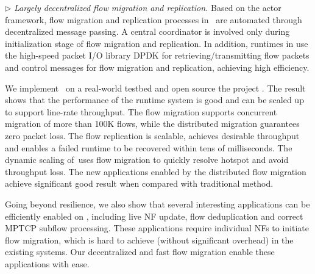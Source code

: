 

$\triangleright$ {\em Largely decentralized flow migration and replication.} Based on the actor framework, flow migration and replication processes in \nfactor~are automated through decentralized message passing. A central coordinator is involved only during initialization stage of flow migration and replication. %
 In addition, runtimes in \nfactor use the high-speed packet I/O library DPDK \cite{dpdk} for retrieving/transmitting flow packets and control messages for flow migration and replication, achieving high efficiency.


We implement \nfactor~on a real-world testbed and open source the project \cite{projectcode}.
The result shows that the performance of the runtime system is good and can be scaled up to support line-rate throughput. The flow migration supports concurrent migration of more than 100K flows, while the distributed migration guarantees zero packet loss. The flow replication is scalable, achieves desirable throughput and enables a failed runtime to be recovered within tens of milliseconds. The dynamic scaling of~\nfactor uses flow migration to quickly resolve hotspot and avoid throughput loss. The new applications enabled by the distributed flow migration achieve significant good result when compared with traditional method.

Going beyond resilience, we also show that several interesting applications can be efficiently enabled on \nfactor, including live NF update, flow deduplication and correct MPTCP subflow processing. These applications require individual NFs to initiate flow migration, %
which is hard to achieve (without significant overhead) in the existing systems. %
Our decentralized and fast flow migration enable these applications with ease. %


